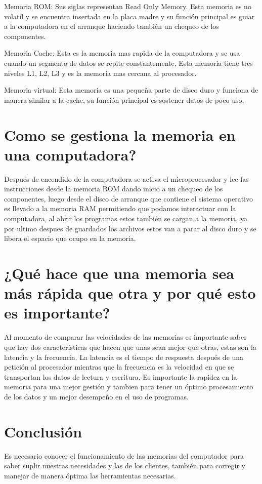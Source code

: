 \documentclass{article}
\begin{document}
Memoria ROM: Sus siglas representan Read Only Memory. Esta memoria es no volatil y se encuentra insertada en la placa madre y su función principal es guiar a la computadora en el arranque haciendo también un chequeo de los componentes.

Memoria Cache: Esta es la memoria mas rapida de la computadora y se usa cuando un segmento de datos se repite constantemente, Esta memoria tiene tres niveles L1, L2, L3 y es la memoria mas cercana al procesador.

Memoria virtual: Esta memoria es una pequeña parte de disco duro y funciona de manera similar a la cache, su función principal es sostener datos de poco uso.


\section{Como se gestiona la memoria en una computadora?} 
Después de encendido de la computadora se activa el microprocesador y lee las instrucciones desde la memoria ROM dando inicio a un chequeo de los componentes, luego desde el disco de arranque que contiene el sistema operativo es llevado a la memoria RAM permitiendo que podamos interactuar con la computadora, al abrir los programas estos también se cargan a la memoria,  ya por ultimo despues de guardados los archivos estos van a parar al disco duro y se libera el espacio que ocupo en la memoria.


\section{¿Qué hace que una memoria sea más rápida que otra y por qué esto es importante?}
Al momento de comparar las velocidades de las memorias es importante saber que hay dos características que hacen que unas sean mejor que otras, estas son la latencia y la frecuencia. La latencia es el tiempo de respuesta después de una petición al procesador mientras que la frecuencia es la velocidad en que se transportan los datos de lectura y escritura. Es importante  la rapidez en la memoria para una mejor gestión y tambien para tener un óptimo procesamiento de los datos y un mejor desempeño en el uso de programas.



\section{Conclusión} \label{conclulsion}
Es necesario conocer el funcionamiento de las memorias del computador para saber suplir nuestras necesidades y las de los clientes, también para corregir y manejar de manera óptima las herramientas necesarias.





\cite{augusto}

\cite{computerhoy}

\cite{Nociones}
\end{document}
